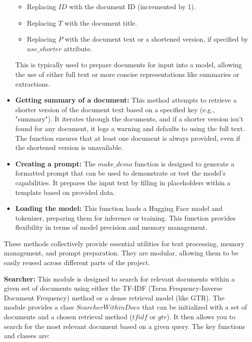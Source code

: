\begin{itemize}
    \begin{itemize}
        \item Replacing $ID$ with the document ID (incremented by 1).
        \item Replacing $T$ with the document title.
        \item Replacing $P$ with the document text or a shortened version, if specified by $use\_shorter$ attribute.
    \end{itemize}

    This is typically used to prepare documents for input into a model, allowing the use of either full text or more concise representations like summaries or extractions.

    \item \textbf{Getting summary of a document:} This method attempts to retrieve a shorter version of the document text based on a specified key (e.g., "summary"). It iterates through the documents, and if a shorter version isn't found for any document, it logs a warning and defaults to using the full text. The function ensures that at least one document is always provided, even if the shortened version is unavailable.

    \item \textbf{Creating a prompt:} The $make\_demo$ function is designed to generate a formatted prompt that can be used to demonstrate or test the model’s capabilities. It prepares the input text by filling in placeholders within a template based on provided data.

    \item \textbf{Loading the model:} This function loads a Hugging Face model and tokenizer, preparing them for inference or training. This function provides flexibility in terms of model precision and memory management.
\end{itemize}

These methods collectively provide essential utilities for text processing, memory management, and prompt preparation. They are modular, allowing them to be easily reused across different parts of the project.

\textbf{Searcher:} This module is designed to search for relevant documents within a given set of documents using either the TF-IDF (Term Frequency-Inverse Document Frequency) method or a dense retrieval model (like GTR). The module provides a class $SearcherWithinDocs$ that can be initialized with a set of documents and a chosen retrieval method ($tfidf$ or $gtr$). It then allows you to search for the most relevant document based on a given query. The key functions and classes are:

